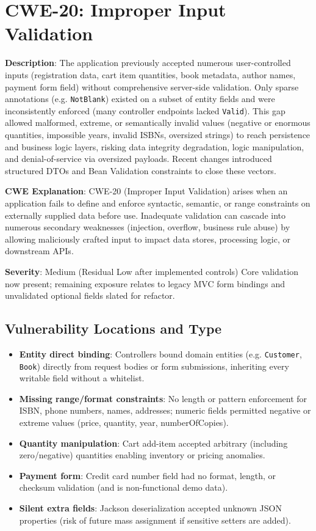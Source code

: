\documentclass[]{UCD_CS_FYP_Report}
\begin{document}
\section{CWE-20: Improper Input Validation}

	\textbf{Description}: The application previously accepted numerous user-controlled inputs (registration data, cart item quantities, book metadata, author names, payment form field) without comprehensive server-side validation. Only sparse annotations (e.g. \texttt{NotBlank}) existed on a subset of entity fields and were inconsistently enforced (many controller endpoints lacked \texttt{Valid}). This gap allowed malformed, extreme, or semantically invalid values (negative or enormous quantities, impossible years, invalid ISBNs, oversized strings) to reach persistence and business logic layers, risking data integrity degradation, logic manipulation, and denial-of-service via oversized payloads. Recent changes introduced structured DTOs and Bean Validation constraints to close these vectors.

	\textbf{CWE Explanation}: CWE-20 (Improper Input Validation) arises when an application fails to define and enforce syntactic, semantic, or range constraints on externally supplied data before use. Inadequate validation can cascade into numerous secondary weaknesses (injection, overflow, business rule abuse) by allowing maliciously crafted input to impact data stores, processing logic, or downstream APIs.

	\textbf{Severity}: Medium (Residual Low after implemented controls)  Core validation now present; remaining exposure relates to legacy MVC form bindings and unvalidated optional fields slated for refactor.

\subsection*{Vulnerability Locations and Type}
\begin{itemize}
	\item \textbf{Entity direct binding}: Controllers bound domain entities (e.g. \texttt{Customer}, \texttt{Book}) directly from request bodies or form submissions, inheriting every writable field without a whitelist.
	\item \textbf{Missing range/format constraints}: No length or pattern enforcement for ISBN, phone numbers, names, addresses; numeric fields permitted negative or extreme values (price, quantity, year, numberOfCopies).
	\item \textbf{Quantity manipulation}: Cart add-item accepted arbitrary (including zero/negative) quantities enabling inventory or pricing anomalies.
	\item \textbf{Payment form}: Credit card number field had no format, length, or checksum validation (and is non-functional demo data).
	\item \textbf{Silent extra fields}: Jackson deserialization accepted unknown JSON properties (risk of future mass assignment if sensitive setters are added).
\end{itemize}
\end{document}
